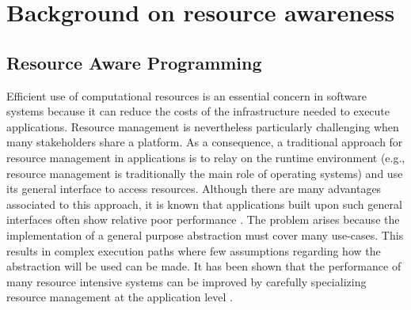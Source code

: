 \chapter{Background on resource awareness}
\label{chp:background_resource_awareness}


\section{Resource Aware Programming} \label{sec:resource-awareness}

Efficient use of computational resources is an essential concern in software systems because it can reduce the costs of the infrastructure needed to execute applications.
Resource management is nevertheless particularly challenging when many stakeholders share a platform.
As a consequence, a traditional approach for resource management in applications is to relay on the runtime environment (e.g., resource management is traditionally the main role of operating systems) and use its general interface to access resources.
Although there are many advantages associated to this approach, it is known that applications built upon such general interfaces often show relative poor performance \cite{engler1995exokernel}.
The problem arises because the implementation of a general purpose abstraction must cover many use-cases.
This results in complex execution paths where few assumptions regarding how the abstraction will be used can be made.
It has been shown that the performance of many resource intensive systems can be improved by carefully specializing resource management at the application level \cite{engler1995exokernel,Belay:2014:IPD:2685048.2685053,Marinos:2014:NSS:2619239.2626311}.

